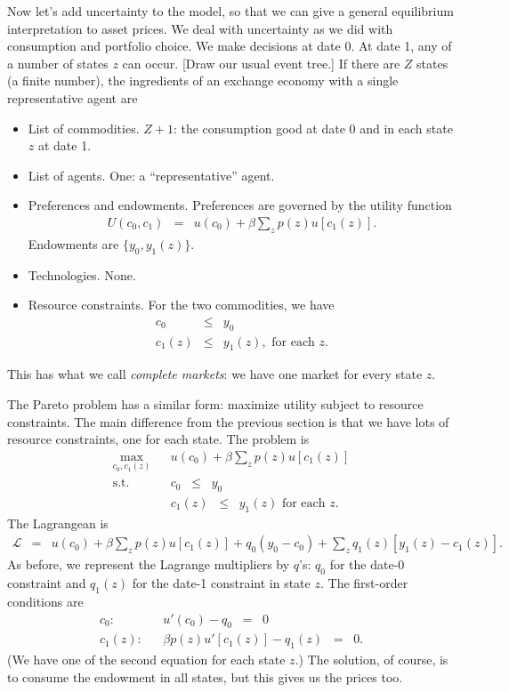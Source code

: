 \documentclass[11pt]{article}
\begin{document}
Now let's add uncertainty to the model, so that we can give a general
equilibrium interpretation to asset prices.
We deal with uncertainty as we did with consumption and portfolio choice.
We make decisions at date 0.
At date 1, any of a number of states $z$ can occur.
[Draw our usual event tree.]
If there are $Z$ states (a finite number), the ingredients of
an exchange economy with a single representative agent are
\begin{itemize}
\item List of commodities.  $Z+1$:  the consumption good at date 0
and in each state $z$ at date 1.
\item List of agents.  One: a ``representative'' agent.
\item Preferences and endowments.  Preferences are governed by the utility function
\begin{eqnarray*}
    U(c_0,c_1) &=& u(c_0) + \beta \sum_z p(z) u[c_1(z)] .
\end{eqnarray*}
Endowments are $\{y_0,y_1(z)\}$.
\item Technologies.  None.
\item Resource constraints.  For the two commodities,
we have
\begin{eqnarray*}
    c_0 &\leq& y_0 \\
    c_1(z) &\leq& y_1(z), \mbox{ for each } z .
\end{eqnarray*}
\end{itemize}
This has what we call {\it complete markets\/}:  we have one market for every state $z$.

The Pareto problem has a similar form:  maximize utility subject to
resource constraints.
The main difference from the previous section is that we have lots of resource
constraints, one for each state.
The problem is
\begin{eqnarray*}
    \max_{c_0,c_1(z)} && u(c_0) + \beta \sum_z p(z) u[c_1(z)] \\
    \mbox{s.t.}   &&  c_0  \;\;\leq\;\; y_0 \\
                  &&  c_1(z) \;\;\leq\;\; y_1(z) \mbox{ for each } z.
\end{eqnarray*}
The Lagrangean is
\begin{eqnarray*}
    \mathcal{L} &=&  u(c_0) + \beta \sum_z p(z) u[c_1(z)] + q_0 (y_0 - c_0)
                    + \sum_z q_1(z)  [ y_1(z) - c_1(z)]  .
\end{eqnarray*}
As before, we represent the Lagrange multipliers by $q$'s:
$q_0$ for the date-0 constraint and $q_1(z)$ for the date-1 constraint in state $z$.
The first-order conditions are
\begin{eqnarray*}
    c_0: &&  u'(c_0) - q_0 \;\;=\;\; 0 \\
    c_1(z): &&  \beta p(z) u'[c_1(z)] - q_1(z) \;\;=\;\; 0 .
\end{eqnarray*}
(We have one of the second equation for each state $z$.)
The solution, of course, is to consume the endowment in all states,
but this gives us the prices too.
\end{document}
